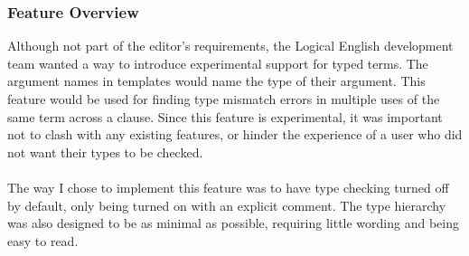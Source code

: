 \documentclass[../main.tex]{subfiles}
\begin{document}
\subsubsection{Feature Overview}
Although not part of the editor's requirements, the Logical English development team wanted a way to introduce experimental support for typed terms. The argument names in templates would name the type of their argument. This feature would be used for finding type mismatch errors in multiple uses of the same term across a clause. Since this feature is experimental, it was important not to clash with any existing features, or hinder the experience of a user who did not want their types to be checked.
\\
\\
The way I chose to implement this feature was to have type checking turned off by default, only being turned on with an explicit  comment. The type hierarchy was also designed to be as minimal as possible, requiring little wording and being easy to read. 
\end{document}
